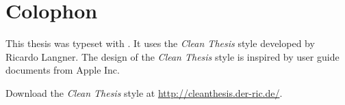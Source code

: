 %
\pagestyle{empty}
\hfill
\vfill
{}
\section*{Colophon}

This thesis was typeset with \LaTeXe.
It uses the \textit{Clean Thesis} style developed by Ricardo Langner.
The design of the \textit{Clean Thesis} style is inspired by user guide documents from Apple Inc.

Download the \textit{Clean Thesis} style at \url{http://cleanthesis.der-ric.de/}.
